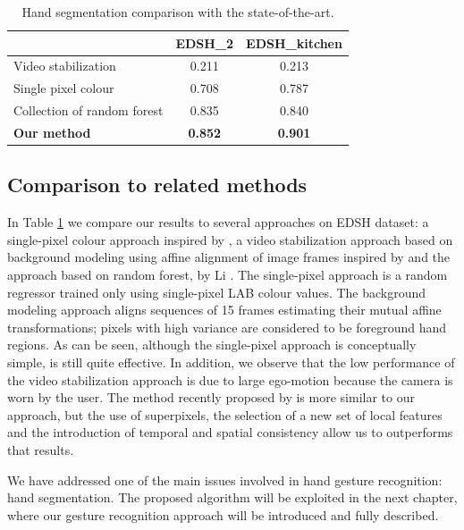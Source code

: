 \begin{table}
 \centering
 \begin{tabular}{|l|c|c|}
 \hline
  	& \textbf{EDSH\_2}	& \textbf{EDSH\_{kitchen}} \\ \hline\hline
Video stabilization  \cite{hayman03} 	& 0.211 & 0.213		\\ \hline
Single pixel colour \cite{jones99}	& 0.708 &	0.787	\\ \hline  
Collection of random forest \cite{li13} & 0.835 & 0.840		\\ \hline  
\textbf{Our method} & \textbf{0.852} &	\textbf{0.901}	\\ \hline 
\end{tabular}
\caption{Hand segmentation comparison with the state-of-the-art.}\label{tab:comparision_hand}
\end{table}



\subsection{Comparison to related methods}

In Table \ref{tab:comparision_hand} we compare our results to several approaches on EDSH dataset: a single-pixel colour approach inspired by \cite{jones99}, a video stabilization approach based on background modeling using affine alignment of image frames inspired by
\cite{hayman03} and the approach based on random forest, by Li \etal \cite{li13}. 
The single-pixel approach is a random regressor trained only using single-pixel LAB colour values. 
The background modeling approach aligns sequences of 15 frames estimating their mutual affine transformations; pixels with high variance are considered to be foreground hand regions. 
As can be seen, although the single-pixel approach is conceptually simple, is still quite effective. In addition, we observe that the low performance of the video stabilization approach is due to large ego-motion because the camera is worn by the user.     
The method recently proposed by \cite{li13} is more similar to our approach, but the use of superpixels, the selection of a new set of local features and the introduction of temporal and spatial consistency allow us to outperforms that results.

\medskip
We have addressed one of the main issues involved in hand gesture recognition: hand segmentation. The proposed algorithm will be exploited in the next chapter, where our gesture recognition approach will be introduced and fully described.
